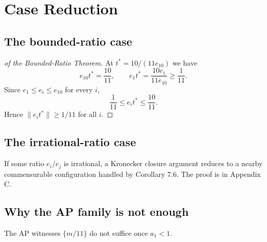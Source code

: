 \documentclass[12pt]{article}
\begin{document}
\section{Case Reduction}

\subsection{The bounded-ratio case}

\begin{proof}[of the Bounded-Ratio Theorem]
At $t^*=10/(11e_{10})$ we have
\[
e_{10}t^* = \frac{10}{11},\qquad e_1 t^* = \frac{10e_1}{11e_{10}} \ge \frac{1}{11}.
\]
Since $e_1\le e_i\le e_{10}$ for every $i$,
\[
\frac{1}{11}\le e_i t^*\le \frac{10}{11}.
\]
Hence $\|e_i t^*\|\ge 1/11$ for all $i$.
\end{proof}

\subsection{The irrational-ratio case}

If some ratio $e_i/e_j$ is irrational, a Kronecker closure argument reduces to a nearby
commensurable configuration handled by Corollary 7.6. The proof is in Appendix C.

\subsection{Why the AP family is not enough}

The AP witnesses $\{m/11\}$ do not suffice once $a_1<1$.
\end{document}
